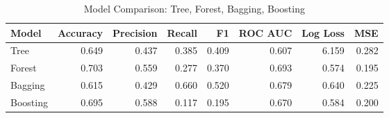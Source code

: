 \begin{table}[H]
\caption{Model Comparison: Tree, Forest, Bagging, Boosting}
\label{tab:diffusion_ml_comparison}
\begin{center}
\begin{tabular}{lrrrrrrr}
\toprule
Model & Accuracy & Precision & Recall & F1 & ROC AUC & Log Loss & MSE \\
\midrule
Tree & 0.649 & 0.437 & 0.385 & 0.409 & 0.607 & 6.159 & 0.282 \\
Forest & 0.703 & 0.559 & 0.277 & 0.370 & 0.693 & 0.574 & 0.195 \\
Bagging & 0.615 & 0.429 & 0.660 & 0.520 & 0.679 & 0.640 & 0.225 \\
Boosting & 0.695 & 0.588 & 0.117 & 0.195 & 0.670 & 0.584 & 0.200 \\
\bottomrule
\end{tabular}
\end{center}
\end{table}
